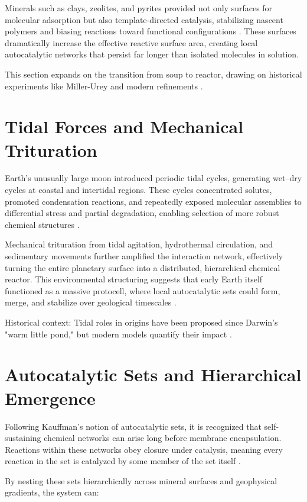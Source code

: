 \documentclass[openany]{book}
\begin{document}
Minerals such as clays, zeolites, and pyrites provided not only surfaces for molecular adsorption but also template-directed catalysis, stabilizing nascent polymers and biasing reactions toward functional configurations \citep{hazen2005}. These surfaces dramatically increase the effective reactive surface area, creating local autocatalytic networks that persist far longer than isolated molecules in solution.

This section expands on the transition from soup to reactor, drawing on historical experiments like Miller-Urey \citep{miller1959} and modern refinements \citep{sutherland2016}.

\section{Tidal Forces and Mechanical Trituration}
Earth’s unusually large moon introduced periodic tidal cycles, generating wet–dry cycles at coastal and intertidal regions. These cycles concentrated solutes, promoted condensation reactions, and repeatedly exposed molecular assemblies to differential stress and partial degradation, enabling selection of more robust chemical structures \citep{toppozada2021}.

Mechanical trituration from tidal agitation, hydrothermal circulation, and sedimentary movements further amplified the interaction network, effectively turning the entire planetary surface into a distributed, hierarchical chemical reactor. This environmental structuring suggests that early Earth itself functioned as a massive protocell, where local autocatalytic sets could form, merge, and stabilize over geological timescales \citep{plum2025}.

Historical context: Tidal roles in origins have been proposed since Darwin's "warm little pond," but modern models quantify their impact \citep{da2017}.

\section{Autocatalytic Sets and Hierarchical Emergence}
Following Kauffman’s notion of autocatalytic sets, it is recognized that self-sustaining chemical networks can arise long before membrane encapsulation. Reactions within these networks obey closure under catalysis, meaning every reaction in the set is catalyzed by some member of the set itself \citep{kauffman1993}.

By nesting these sets hierarchically across mineral surfaces and geophysical gradients, the system can:
\end{document}
